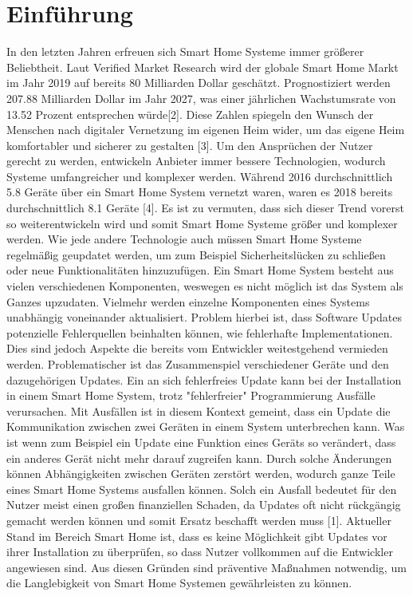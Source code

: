 \chapter{Einführung}

In den letzten Jahren erfreuen sich Smart Home Systeme immer größerer Beliebtheit. Laut Verified Market Research wird
der globale Smart Home Markt im Jahr 2019 auf bereits 80 Milliarden Dollar geschätzt. Prognostiziert werden 207.88 
Milliarden Dollar im Jahr 2027, was einer jährlichen Wachstumsrate von 13.52 Prozent entsprechen würde[2].
Diese Zahlen spiegeln den Wunsch der Menschen nach digitaler Vernetzung im eigenen Heim wider, um das eigene Heim
komfortabler und sicherer zu gestalten [3].
Um den Ansprüchen der Nutzer gerecht zu werden, entwickeln Anbieter immer bessere Technologien,
wodurch Systeme umfangreicher und komplexer werden. Während 2016
durchschnittlich 5.8 Geräte über ein Smart Home System vernetzt waren, waren es 2018 bereits durchschnittlich 8.1 Geräte [4]. 
Es ist zu vermuten, dass sich dieser Trend vorerst so weiterentwickeln wird und somit Smart Home Systeme
größer und komplexer werden.
Wie jede andere Technologie auch müssen Smart Home Systeme regelmäßig geupdatet werden, um zum Beispiel
Sicherheitslücken zu schließen oder neue Funktionalitäten hinzuzufügen. Ein Smart Home System besteht aus vielen verschiedenen
Komponenten, weswegen es nicht möglich ist das System als Ganzes upzudaten. Vielmehr werden einzelne Komponenten eines Systems
unabhängig voneinander aktualisiert. Problem hierbei ist, dass Software Updates potenzielle Fehlerquellen beinhalten können, wie
fehlerhafte Implementationen. Dies sind jedoch Aspekte die bereits vom Entwickler weitestgehend vermieden werden.
Problematischer ist das Zusammenspiel verschiedener Geräte und den dazugehörigen Updates. Ein an sich fehlerfreies Update
kann bei der Installation in einem Smart Home System, trotz "fehlerfreier" Programmierung Ausfälle verursachen. Mit Ausfällen
ist in diesem Kontext gemeint, dass ein Update die Kommunikation zwischen zwei Geräten in einem System unterbrechen kann.
Was ist wenn zum Beispiel 
ein Update eine Funktion eines Geräts so verändert, dass ein anderes Gerät nicht mehr darauf zugreifen kann. Durch solche Änderungen
können Abhängigkeiten zwischen Geräten zerstört werden, wodurch ganze Teile eines Smart Home Systems ausfallen
können. Solch ein Ausfall bedeutet für den Nutzer meist einen großen finanziellen Schaden, da Updates oft nicht 
rückgängig gemacht werden können und somit Ersatz beschafft werden muss [1].
Aktueller Stand im Bereich Smart Home ist, dass es keine Möglichkeit gibt Updates vor ihrer Installation zu überprüfen, so dass Nutzer vollkommen
auf die Entwickler angewiesen sind. 
Aus diesen Gründen sind präventive Maßnahmen notwendig, um die Langlebigkeit von Smart Home Systemen gewährleisten zu können.



